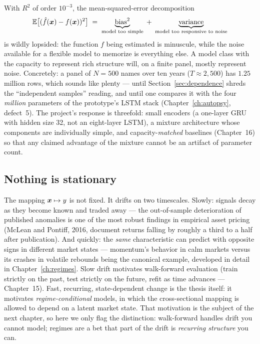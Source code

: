 With $R^2$ of order $10^{-3}$, the mean-squared-error decomposition
\[
  \mathbb{E}\bigl[(\hat f(\bm{x}) - f(\bm{x}))^2\bigr]
  \;=\; \underbrace{\text{bias}^2}_{\text{model too simple}}
  \;+\; \underbrace{\text{variance}}_{\text{model too responsive to noise}}
\]
is wildly lopsided: the function $f$ being estimated is minuscule, while the
noise available for a flexible model to memorize is everything else. A model
class with the capacity to represent rich structure will, on a finite panel,
mostly represent noise. Concretely: a panel of $N = 500$ names over ten years
($T \approx 2{,}500$) has $1.25$ million rows, which sounds like plenty ---
until Section~\ref{sec:dependence} shreds the ``independent samples''
reading, and until one compares it with the four \emph{million} parameters of
the prototype's LSTM stack (Chapter~\ref{ch:autopsy}, defect~5). The
project's response is threefold: small encoders (a one-layer GRU with hidden
size 32, not an eight-layer LSTM), a mixture architecture whose components
are individually simple, and capacity-\emph{matched} baselines (Chapter~16)
so that any claimed advantage of the mixture cannot be an artifact of
parameter count.

\subsection{Nothing is stationary}

The mapping $\bm{x} \mapsto y$ is not fixed. It drifts on two timescales.
Slowly: signals decay as they become known and traded away --- the
out-of-sample deterioration of published anomalies is one of the most robust
findings in empirical asset pricing (McLean and Pontiff, 2016, document
returns falling by roughly a third to a half after publication). And quickly:
the \emph{same} characteristic can predict with opposite signs in different
market states --- momentum's behavior in calm markets versus its crashes in
volatile rebounds being the canonical example, developed in detail in
Chapter~\ref{ch:regimes}. Slow drift motivates walk-forward evaluation
(train strictly on the past, test strictly on the future, refit as time
advances --- Chapter~15). Fast, recurring, state-dependent change is the
thesis itself: it motivates \emph{regime-conditional} models, in which the
cross-sectional mapping is allowed to depend on a latent market state. That
motivation is the subject of the next chapter, so here we only flag the
distinction: walk-forward handles drift you cannot model; regimes are a bet
that part of the drift is \emph{recurring structure} you can.

